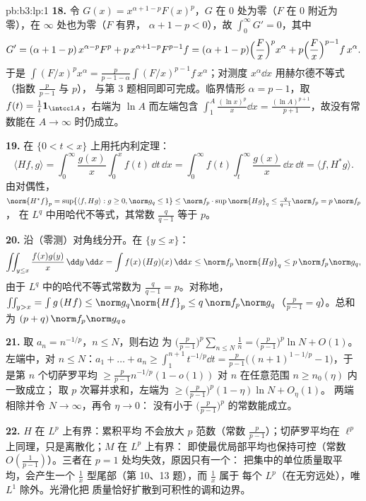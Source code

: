 \begin{solution}{pb:b3:lp:1}
\textbf{18.} 令 $G(x) = x^{\alpha+1-p}F(x)^p$，$G$ 在
$0$ 处为零（$F$ 在 $0$ 附近为零），在 $\infty$ 处也为零（$F$ 有界，
$\alpha + 1 - p < 0$），故 $\int_0^\infty G' = 0$，其中
\[
G' = (\alpha + 1 - p)\,x^{\alpha-p}F^p +
p\,x^{\alpha+1-p}F^{p-1}f
= (\alpha + 1 - p)\Bigl(\frac Fx\Bigr)^px^\alpha +
p\Bigl(\frac Fx\Bigr)^{p-1}f\,x^\alpha .
\]
于是 $\int(F/x)^px^\alpha = \frac{p}{p-1-\alpha}
\int(F/x)^{p-1}f\,x^\alpha$；对测度
$x^\alpha\dd x$ 用赫尔德不等式（指数 $\frac p{p-1}$ 与 $p$），
与第 3 题相同即可完成。临界情形 $\alpha = p - 1$，取 $f(t) =
\frac1t\mathbf 1_{\intcc1A}$，右端为 $\ln A$
而左端包含 $\int_1^A\frac{(\ln x)^p}x\dd x =
\frac{(\ln A)^{p+1}}{p+1}$，故没有常数能在 $A \to
\infty$ 时仍成立。

\textbf{19.} 在 $\{0 < t < x\}$ 上用托内利定理：
\[
\langle Hf, g\rangle =
\int_0^\infty\frac{g(x)}x\int_0^xf(t)\,\dd t\,\dd x
= \int_0^\infty f(t)\int_t^\infty\frac{g(x)}x\,\dd x\,\dd t
= \langle f, H^*g\rangle .
\]
由对偶性，$\norm{H^*f}_p = \sup\{\langle f, Hg\rangle : g
\geq 0, \norm g_q \leq 1\} \leq \norm f_p\cdot
\sup\norm{Hg}_q \leq \frac q{q-1}\norm f_p = p\,\norm f_p$，
在 $L^q$ 中用哈代不等式，其常数 $\frac q{q-1}$
等于 $p$。

\textbf{20.} 沿（零测）对角线分开。在 $\{y \leq
x\}$：
\[
\iint_{y\leq x}\frac{f(x)g(y)}{x}\,\dd y\,\dd x
= \int f(x)\,(Hg)(x)\,\dd x \leq \norm f_p\,\norm{Hg}_q
\leq p\,\norm f_p\norm g_q,
\]
由于 $L^q$ 中的哈代不等式常数为 $\frac q{q-1} =
p$。对称地，$\iint_{y>x} = \int g\,(Hf) \leq
\norm g_q\norm{Hf}_p \leq q\,\norm f_p\norm g_q$（$\frac
p{p-1} = q$）。总和为 $(p + q)\,\norm f_p\norm g_q$。

\textbf{21.} 取 $a_n = n^{-1/p}$，$n \leq N$，则右边
为 $\bigl(\frac p{p-1}\bigr)^p\sum_{n\leq N}\frac1n =
\bigl(\frac p{p-1}\bigr)^p\ln N + O(1)$。左端中，对 $n
\leq N$：$a_1 + \dots + a_n \geq \int_1^{n+1}t^{-1/p}\dd t =
\frac{p}{p-1}\bigl((n+1)^{1-1/p} - 1\bigr)$，于是第 $n$
个切萨罗平均 $\geq \frac p{p-1}n^{-1/p}(1 -
o(1))$ 对 $n$ 在任意范围 $n \geq n_0(\eta)$ 内一致成立；
取 $p$ 次幂并求和，左端为 $\geq
\bigl(\frac p{p-1}\bigr)^p(1 - \eta)\ln N + O_\eta(1)$。
两端相除并令 $N \to \infty$，再令 $\eta \to 0$：
没有小于 $\bigl(\frac p{p-1}\bigr)^p$ 的常数能成立。

\textbf{22.} $H$ 在 $L^p$ 上有界：累积平均
不会放大 $p$ 范数（常数 $\frac p{p-1}$）；切萨罗平均在
$\ell^p$ 上同理，只是离散化；$M$ 在 $L^p$ 上有界：
即使最优局部平均也保持可控（常数
$O(\frac1{p-1})$）。三者在 $p = 1$ 处均失效，原因只有一个：
把集中的单位质量取平均，会产生一个
$\frac1x$ 型尾部（第 10、13 题），而 $\frac1x$ 属于
每个 $L^p$（在无穷远处），唯 $L^1$ 除外。光滑化把
质量恰好扩散到可积性的调和边界。


\end{solution}
